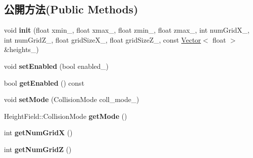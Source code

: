 \subsection*{公開方法(Public Methods)}
\begin{DoxyCompactItemize}
\item 
void {\bfseries init} (float xmin\+\_\+, float xmax\+\_\+, float zmin\+\_\+, float zmax\+\_\+, int num\+Grid\+X\+\_\+, int num\+Grid\+Z\+\_\+, float grid\+Size\+X\+\_\+, float grid\+Size\+Z\+\_\+, const \hyperlink{class_i_dream_sky_1_1_vector}{Vector}$<$ float $>$ \&heights\+\_\+)\hypertarget{class_i_dream_sky_1_1_scene_collision_1_1_height_field_ab74ec98982526edfdca5d0e5db8c496b}{}\label{class_i_dream_sky_1_1_scene_collision_1_1_height_field_ab74ec98982526edfdca5d0e5db8c496b}

\item 
void {\bfseries set\+Enabled} (bool enabled\+\_\+)\hypertarget{class_i_dream_sky_1_1_scene_collision_1_1_height_field_addcd9b6e5251976736e388955dc593d0}{}\label{class_i_dream_sky_1_1_scene_collision_1_1_height_field_addcd9b6e5251976736e388955dc593d0}

\item 
bool {\bfseries get\+Enabled} () const \hypertarget{class_i_dream_sky_1_1_scene_collision_1_1_height_field_aa2e8ff3a99dc02a33cda2812be07ca57}{}\label{class_i_dream_sky_1_1_scene_collision_1_1_height_field_aa2e8ff3a99dc02a33cda2812be07ca57}

\item 
void {\bfseries set\+Mode} (Collision\+Mode coll\+\_\+mode\+\_\+)\hypertarget{class_i_dream_sky_1_1_scene_collision_1_1_height_field_ae96e1b9a117ddd21306e248d707d094b}{}\label{class_i_dream_sky_1_1_scene_collision_1_1_height_field_ae96e1b9a117ddd21306e248d707d094b}

\item 
Height\+Field\+::\+Collision\+Mode {\bfseries get\+Mode} ()\hypertarget{class_i_dream_sky_1_1_scene_collision_1_1_height_field_ad898907dc99013e0856c7fa9158a6504}{}\label{class_i_dream_sky_1_1_scene_collision_1_1_height_field_ad898907dc99013e0856c7fa9158a6504}

\item 
int {\bfseries get\+Num\+GridX} ()\hypertarget{class_i_dream_sky_1_1_scene_collision_1_1_height_field_a8be13ec763ab6bf1e2dd274ee94ee5c6}{}\label{class_i_dream_sky_1_1_scene_collision_1_1_height_field_a8be13ec763ab6bf1e2dd274ee94ee5c6}

\item 
int {\bfseries get\+Num\+GridZ} ()\hypertarget{class_i_dream_sky_1_1_scene_collision_1_1_height_field_ac19b07a7d43d24ea4c4c553b388d8c4e}{}\label{class_i_dream_sky_1_1_scene_collision_1_1_height_field_ac19b07a7d43d24ea4c4c553b388d8c4e}


\end{DoxyCompactItemize}
